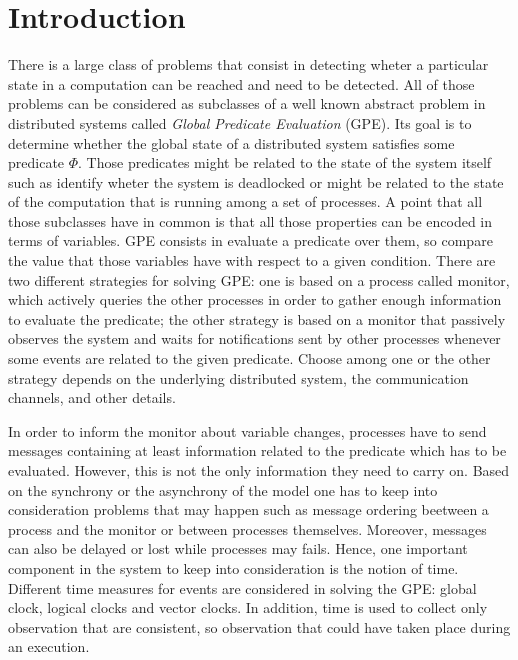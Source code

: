 \documentclass[11pt]{article}
\begin{document}


{}
\setcounter{page}{1}
\section{Introduction}

There is a large class of problems that consist in detecting wheter a particular state in a computation can be reached and need to be detected.
All of those problems can be considered as subclasses of a well known abstract problem in distributed systems called \textit{Global Predicate Evaluation} (GPE). Its goal is to determine whether the global state of a distributed system satisfies some predicate $\Phi$. Those predicates might be related to the state of the system itself such as identify wheter the system is deadlocked or might be related to the state of the computation that is running among a set of processes. A point that all those subclasses have in common is that all those properties can be encoded in terms of variables. GPE consists in evaluate a predicate over them, so compare the value that those variables have with respect to a given condition. There are two different strategies for solving GPE: one is based on a process called monitor, which actively queries the other processes in order to gather enough information to evaluate the predicate; the other strategy is based on a monitor that passively observes the system and waits for notifications sent by other processes whenever some events are related to the given predicate. Choose among one or the other strategy depends on the underlying distributed system, the communication channels, and other details.

In order to inform the monitor about variable changes, processes have to send messages containing at least information related to the predicate which has to be evaluated. However, this is not the only information they need to carry on. Based on the synchrony or the asynchrony of the model one has to keep into consideration problems that may happen such as message ordering beetween a process and the monitor or between processes themselves. Moreover, messages can also be delayed or lost while processes may fails. Hence, one important component in the system to keep into consideration is the notion of time. Different time measures for events are considered in solving the GPE: global clock, logical clocks and vector clocks. In addition, time is used to collect only observation that are consistent, so observation that could have taken place during an execution.
\end{document}
